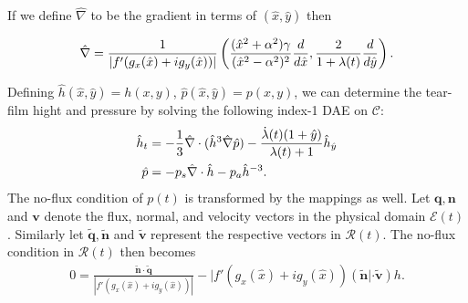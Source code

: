 If we define $\hat{\nabla}$ to be the gradient in terms of $(\hat{x},\hat{y})$ then

\begin{align}
\hat{\nabla} = \frac{1}{|f'(g_x(\hat{x})+i g_y(\hat{x}))|} \left( \frac{(\hat{x}^2+\alpha^2)\gamma}{(\hat{x}^2-\alpha^2)^2} \frac{d}{d \hat{x}}, \frac{2}{1+\lambda(t)} \frac{d}{d \hat{y}} \right).
\end{align}

Defining $\hat{h}(\hat{x},\hat{y})=h(x,y)$, $\hat{p}(\hat{x},\hat{y})=p(x,y)$, we can determine the tear-film hight and pressure by solving the following index-1 DAE on $\mathcal{C}$:
\begin{align}
\begin{aligned}
\hat{h}_t &= -\frac{1}{3} \hat{\nabla} \cdot (\hat{h}^3 \hat{\nabla} \hat{p}) -\frac{\dot{\lambda}(t)(1+\hat{y})}{\lambda(t)+1} \hat{h}_{\hat{y}} \\
\hat{p} &= - p_s \hat{\nabla} \cdot \hat{h} - p_a \hat{h}^{-3}.
\end{aligned}
\end{align}
The no-flux condition of $p(t)$ is transformed by the mappings as well. Let $\bm{q},\bm{n}$ and $\bm{v}$ denote the flux, normal, and velocity vectors in the physical domain $\mathcal{E}(t)$. Similarly let $\bm{\tilde{q}},\bm{\tilde{n}}$ and $\bm{\tilde{v}}$ represent the respective vectors in $\mathcal{R}(t)$. The no-flux condition in $\mathcal{R}(t)$ then becomes
\begin{align}
	0 = \frac{\bm{\tilde{n}} \cdot \bm{\tilde{q}}}{|f'(g_x(\hat{x})+i g_y(\hat{x}))|} - |f'(g_x(\hat{x})+i g_y(\hat{x}))(\bm{\tilde{n}}| \cdot \bm{\tilde{v}})h.
\end{align}





